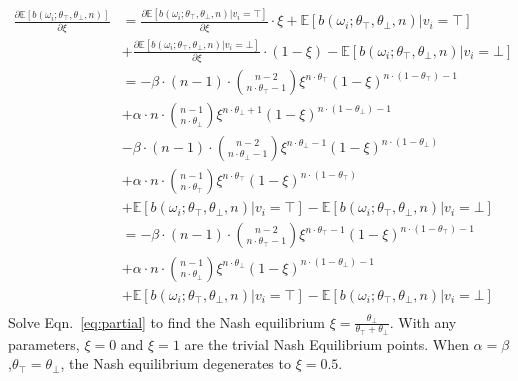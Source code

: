 \documentclass[11pt]{article}
\begin{document}
\begin{equation}
  \label{eq:partial}
  \begin{aligned}
    \frac{\partial\mathbb{E}[b(\omega_i;\theta_\top,\theta_\bot,n)]}{\partial\xi} &= \frac{\partial\mathbb{E}[b(\omega_i;\theta_\top,\theta_\bot,n )| v_i=\top]}{\partial\xi}\cdot \xi+ \mathbb{E}[b(\omega_i;\theta_\top,\theta_\bot,n )| v_i=\top]\\
    &+ \frac{\partial\mathbb{E}[b(\omega_i;\theta_\top,\theta_\bot,n )| v_i=\bot]}{\partial\xi}\cdot (1-\xi)-\mathbb{E}[b(\omega_i;\theta_\top,\theta_\bot,n )| v_i=\bot]\\
    &=-\beta\cdot (n-1)\cdot \binom{n-2}{n\cdot\theta_\top-1}\xi^{n\cdot\theta_\top}(1-\xi)^{n\cdot(1-\theta_\top)-1} \\
    &+\alpha\cdot n \cdot \binom{n-1}{n\cdot\theta_\bot}\xi^{n\cdot\theta_\bot+1}(1-\xi)^{n\cdot(1-\theta_\bot)-1}\\
    & -\beta\cdot (n-1)\cdot \binom{n-2}{n\cdot\theta_\bot-1}\xi^{n\cdot\theta_\bot-1}(1-\xi)^{n\cdot(1-\theta_\bot)} \\
    &+\alpha\cdot n \cdot \binom{n-1}{n\cdot\theta_\top}\xi^{n\cdot\theta_\top}(1-\xi)^{n\cdot(1-\theta_\top)}\\
    &+\mathbb{E}[b(\omega_i;\theta_\top,\theta_\bot,n )| v_i=\top]-\mathbb{E}[b(\omega_i;\theta_\top,\theta_\bot,n )| v_i=\bot]\\
    &=-\beta\cdot (n-1)\cdot \binom{n-2}{n\cdot\theta_\top-1}\xi^{n\cdot\theta_\top-1}(1-\xi)^{n\cdot(1-\theta_\top)-1} \\
    &+\alpha\cdot n \cdot \binom{n-1}{n\cdot\theta_\bot}\xi^{n\cdot\theta_\bot}(1-\xi)^{n\cdot(1-\theta_\bot)-1}\\
    &+\mathbb{E}[b(\omega_i;\theta_\top,\theta_\bot,n )| v_i=\top]-\mathbb{E}[b(\omega_i;\theta_\top,\theta_\bot,n )| v_i=\bot]\\
\end{aligned}
\end{equation}
Solve Eqn.~\ref{eq:partial} to find the Nash equilibrium $\xi=\frac{\theta_\bot}{\theta_\top+\theta_\bot}$.
With any parameters, $\xi=0$ and $\xi=1$ are the trivial Nash Equilibrium points. When $\alpha=\beta$,$\theta_\top=\theta_\bot$, the Nash equilibrium degenerates to $\xi=0.5$.
\end{document}
